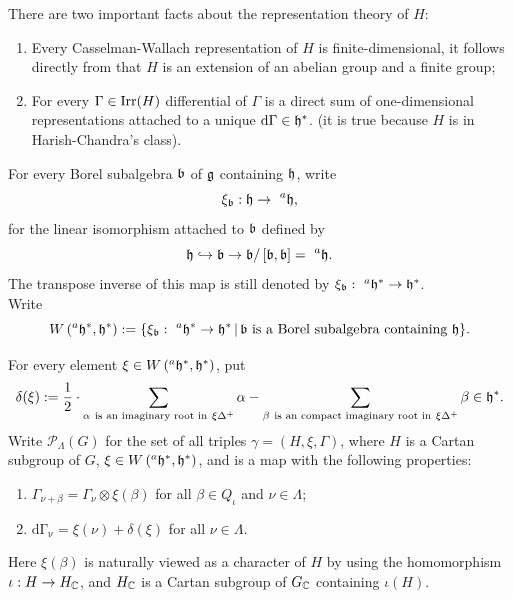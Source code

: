 There are two important facts about the representation theory of $H$:
\begin{enumerate}
  \item Every Casselman-Wallach representation of $H$ is finite-dimensional, it follows directly from that $H$ is an extension of an abelian group and a finite group;
  \item For every $\Gamma \in \operatorname{Irr}(H)$ differential of $\Gamma$ is a direct sum of one-dimensional representations attached to a unique $\mathrm{d\Gamma \in \mathfrak{h}^*}$.
        (it is true because $H$ is in Harish-Chandra's class).
\end{enumerate}


For every Borel subalgebra $\mathfrak{b}$ of $\mathfrak{g}$ containing $\mathfrak{h}$, write 
\[\xi_{\mathfrak{b}}: \mathfrak{h} \to \ ^{a}\mathfrak{h},\]
for the linear isomorphism attached to $\mathfrak{b}$ defined by 
\[\mathfrak{h} \hookrightarrow  \mathfrak{b} \to \mathfrak{b} / \left[\mathfrak{b},\mathfrak{b}\right] = \ {^{a}\mathfrak{h}}.\]
The transpose inverse of this map is still denoted by $\xi_{\fb}: \ ^{a}\fh^* \to \fh^*$.\\


Write \[W\left(^{a}\mathfrak{h}^*,\mathfrak{h}^*\right) :=  \{\xi_{\mathfrak{b}}: \ ^{a}\mathfrak{h}^* \to \mathfrak{h}^*\,|\,\mathfrak{b} \ \textrm{is a Borel subalgebra containing} \ \mathfrak{h}\}.\]

\begin{defn}
  For every element $\xi \in W\left(^{a}\mathfrak{h}^*,\mathfrak{h}^*\right)$, put
  \[\delta(\xi) := \frac{1}{2} \cdot \sum\limits_{\alpha  \ \textrm{is an imaginary root in} \ \xi\Delta^+}\alpha - \sum\limits_{\beta \ \textrm{is an compact imaginary root in} \ \xi\Delta^+}\beta \in \fh^* .\]
  Write $\mathcal{P} _{\Lambda}(G)$ for the set of all triples $\gamma = (H,\xi,\Gamma)$, where
  $H$ is a Cartan subgroup of $G$, $\xi \in W\left(^{a}\mathfrak{h}^*,\mathfrak{h}^*\right)$, and
  is a map with the following properties:
  \begin{enumerate}
    \item $\Gamma_{\nu+\beta} = \Gamma_{\nu} \otimes \xi(\beta)$ for all $\beta \in Q_{\iota}$ and $\nu \in \Lambda$;
    \item $\mathrm{d\Gamma_{\nu}} = \xi(\nu) + \delta(\xi)$ for all $\nu \in \Lambda$.
  \end{enumerate}
  Here $\xi(\beta)$ is naturally viewed as a character of $H$ by using the homomorphism
  $\iota : H \to H_{\mathbb{C}}$, and $H_{\mathbb{C}}$ is a Cartan subgroup of $G_{\mathbb{C}}$ containing $\iota(H)$.
\end{defn}



